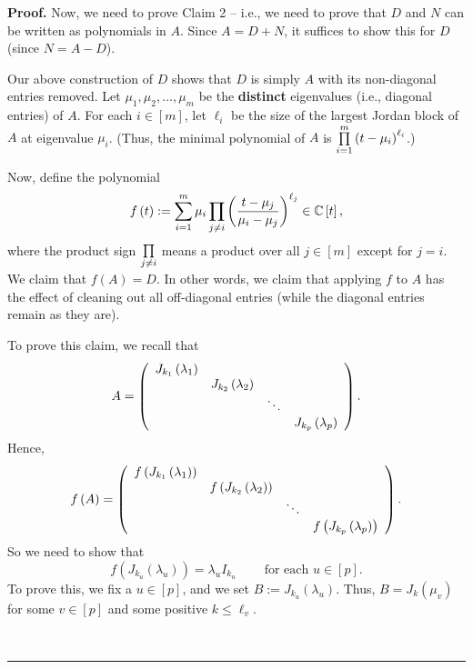 \documentclass[numbers=enddot,12pt,final,onecolumn,notitlepage]{scrartcl}%
\numberwithin{exer}{subsection}
\theoremstyle{definition}
\newenvironment{proof}[1][Proof]{\noindent\textbf{#1.} }{\ \rule{0.5em}{0.5em}}
\let\sumnonlimits\sum
\let\prodnonlimits\prod
\renewcommand{\sum}{\sumnonlimits\limits}
\renewcommand{\prod}{\prodnonlimits\limits}
\begin{document}
\begin{proof}
Now, we need to prove Claim 2 -- i.e., we need to prove that $D$ and $N$ can
be written as polynomials in $A$. Since $A=D+N$, it suffices to show this for
$D$ (since $N=A-D$).

Our above construction of $D$ shows that $D$ is simply $A$ with its
non-diagonal entries removed. Let $\mu_{1},\mu_{2},\ldots,\mu_{m}$ be the
\textbf{distinct} eigenvalues (i.e., diagonal entries) of $A$. For each
$i\in\left[  m\right]  $, let $\ell_{i}$ be the size of the largest Jordan
block of $A$ at eigenvalue $\mu_{i}$. (Thus, the minimal polynomial of $A$ is
$\prod\limits_{i=1}^{m}\left(  t-\mu_{i}\right)  ^{\ell_{i}}$.)

Now, define the polynomial%
\[
f\left(  t\right)  :=\sum_{i=1}^{m}\mu_{i}\prod\limits_{j\neq i}\left(
\dfrac{t-\mu_{j}}{\mu_{i}-\mu_{j}}\right)  ^{\ell_{j}}\in\mathbb{C}\left[
t\right]  ,
\]
where the product sign $\prod\limits_{j\neq i}$ means a product over all
$j\in\left[  m\right]  $ except for $j=i$. We claim that $f\left(  A\right)
=D$. In other words, we claim that applying $f$ to $A$ has the effect of
cleaning out all off-diagonal entries (while the diagonal entries remain as
they are).

To prove this claim, we recall that%
\[
A=\left(
\begin{array}
[c]{cccc}%
J_{k_{1}}\left(  \lambda_{1}\right)   &  &  & \\
& J_{k_{2}}\left(  \lambda_{2}\right)   &  & \\
&  & \ddots & \\
&  &  & J_{k_{p}}\left(  \lambda_{p}\right)
\end{array}
\right)  .
\]
Hence,%
\[
f\left(  A\right)  =\left(
\begin{array}
[c]{cccc}%
f\left(  J_{k_{1}}\left(  \lambda_{1}\right)  \right)   &  &  & \\
& f\left(  J_{k_{2}}\left(  \lambda_{2}\right)  \right)   &  & \\
&  & \ddots & \\
&  &  & f\left(  J_{k_{p}}\left(  \lambda_{p}\right)  \right)
\end{array}
\right)  .
\]
So we need to show that%
\[
f\left(  J_{k_{u}}\left(  \lambda_{u}\right)  \right)  =\lambda_{u}I_{k_{u}%
}\ \ \ \ \ \ \ \ \ \ \text{for each }u\in\left[  p\right]  .
\]
To prove this, we fix a $u\in\left[  p\right]  $, and we set $B:=J_{k_{u}%
}\left(  \lambda_{u}\right)  $. Thus, $B=J_{k}\left(  \mu_{v}\right)  $ for
some $v\in\left[  p\right]  $ and some positive $k\leq\ell_{v}$.


\end{proof}
\end{document}
